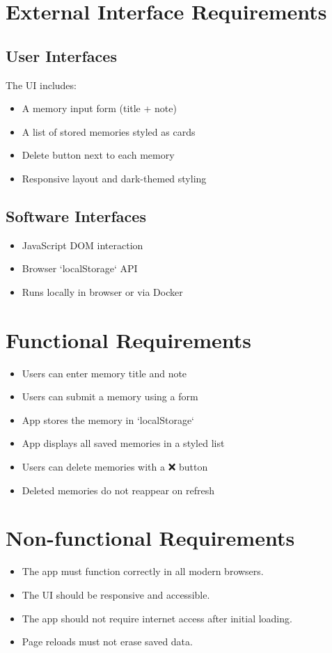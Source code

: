 \documentclass[12pt]{article}
\begin{document}
\section{External Interface Requirements}
\subsection*{User Interfaces}
The UI includes:
\begin{itemize}
    \item A memory input form (title + note)
    \item A list of stored memories styled as cards
    \item Delete button next to each memory
    \item Responsive layout and dark-themed styling
\end{itemize}

\subsection*{Software Interfaces}
\begin{itemize}
    \item JavaScript DOM interaction
    \item Browser `localStorage` API
    \item Runs locally in browser or via Docker
\end{itemize}

\section{Functional Requirements}
\begin{itemize}
    \item Users can enter memory title and note
    \item Users can submit a memory using a form
    \item App stores the memory in `localStorage`
    \item App displays all saved memories in a styled list
    \item Users can delete memories with a ❌ button
    \item Deleted memories do not reappear on refresh
\end{itemize}

\section{Non-functional Requirements}
\begin{itemize}
    \item The app must function correctly in all modern browsers.
    \item The UI should be responsive and accessible.
    \item The app should not require internet access after initial loading.
    \item Page reloads must not erase saved data.
\end{itemize}
\end{document}
